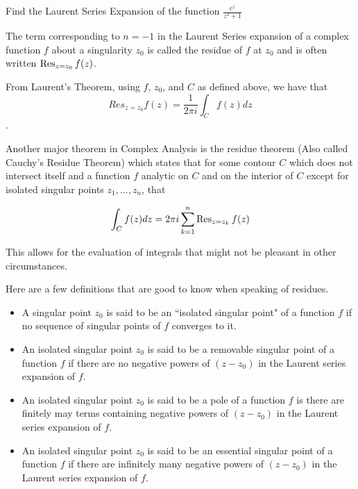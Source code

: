 \begin{problem}
Find the Laurent Series Expansion of the function $\frac{e^{z}}{z^2 +1}$
\end{problem}


The term corresponding to $n=-1$ in the Laurent Series expansion of a complex function $f$ about a singularity $z_0$ is called the residue of $f$ at $z_0$ and is often written $\operatorname{Res}_{z=z_0} f(z)$.

From Laurent's Theorem, using $f$, $z_0$, and $C$ as defined above, we have that $$Res_{z=z_0} f(z) = \frac{1}{2 \pi i} \int_C f(z) dz$$.

Another major theorem in Complex Analysis is the residue theorem (Also called Cauchy's Residue Theorem) which states that for some contour $C$ which does not intersect itself and a function $f$ analytic on $C$ and on the interior of $C$ except for isolated singular points $z_1,...,z_n$, that 

$$\int_C f(z) dz = 2 \pi i \sum_{k=1}^{n} \operatorname{Res}_{z=z_k} f(z)$$

This allows for the evaluation of integrals that might not be pleasant in other circumstances.


Here are a few definitions that are good to know when speaking of residues.
\begin{itemize}
\item A singular point $z_0$ is said to be an ``isolated singular point" of a function $f$ if no sequence of singular points of $f$ converges to it.
\item An isolated singular point $z_0$ is said to be a removable singular point of a function $f$ if there are no negative powers of $(z-z_0)$ in the Laurent series expansion of $f$.
\item An isolated singular point $z_0$ is said to be a pole of a function $f$ is there are finitely may terms containing negative powers of $(z-z_0)$ in the Laurent series expansion of $f$. 
\item An isolated singular point $z_0$ is said to be an essential singular point of a function $f$ if there are infinitely many negative powers of $(z-z_0)$ in the Laurent series expansion of $f$.
\end{itemize}

